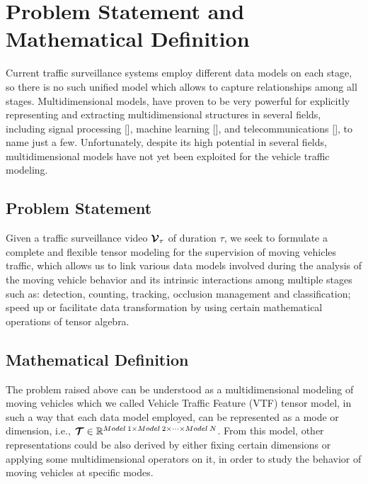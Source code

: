 \documentclass[sensors,article,submit,moreauthors,pdftex]{Definitions/mdpi}
\newcommand{\mathten}[1]{\boldsymbol{\mathbf{\mathcal{\MakeUppercase{#1}}}}}
\begin{document}
\section{Problem Statement and Mathematical Definition}

Current traffic surveillance systems employ different data models on each stage, so there is no such unified model which allows to capture relationships among all stages. Multidimensional models, have proven to be very powerful for explicitly representing and extracting multidimensional structures in several fields, including signal processing [], machine learning [],  and telecommunications [], to name just a few. Unfortunately, despite its high potential in several fields, multidimensional models have not yet been exploited for the vehicle traffic modeling.



\subsection{Problem Statement}
Given a traffic surveillance video $\mathten{V}_\tau$ of duration $\tau$, we seek to formulate a complete and flexible tensor modeling for the supervision of moving vehicles traffic, which allows us to link various data models involved during the analysis of the moving vehicle behavior and its intrinsic interactions among multiple stages such as: detection, counting, tracking, occlusion management and classification; speed up or facilitate data transformation by using certain mathematical operations of tensor algebra.



\subsection{Mathematical Definition}
The problem raised above can be understood as a multidimensional modeling of moving vehicles which we called Vehicle Traffic Feature (VTF) tensor model, in such a way that each data model employed, can be represented as a mode or dimension, i.e., $\mathten{T} \in \mathbb{R}^{Model\:1 \times Model\:2 \times \cdots \times Model\:N}$. From this model, other representations could be also derived by either fixing certain dimensions or applying some multidimensional operators on it, in order to study the behavior of moving vehicles at specific modes.


\end{document}
